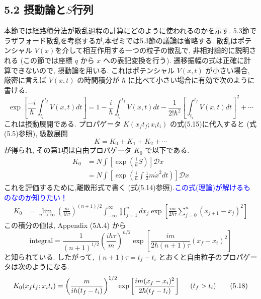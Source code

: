 \documentclass{jsarticle}
\begin{document}
\subsection*{\textrm{5.2 摂動論と$S$行列}}
本節では経路積分法が散乱過程の計算にどのように使われるのかを示す. 5.3節でラザフォード散乱を考察するが,本ゼミでは5.3節の議論は省略する. 散乱はポテンシャル $V(x)$を介して相互作用する一つの粒子の散乱で, 非相対論的に説明される (この節では座標 $q$ から $x$ への表記変換を行う). 遷移振幅の式は正確に計算できないので, 摂動論を用いる. これはポテンシャル $V(x, t)$ が小さい場合, 厳密に言えば $V(x, t)$ の時間積分が $\hbar$ に比べて小さい場合に有効で次のように書ける.
\begin{equation*}
    \exp\left[ \frac{-i}{\hbar} \int_{t_i}^{t_f} V(x, t)dt \right] = 1 - \frac{i}{\hbar} \int_{t_i}^{t_f} V(x, t)dt - \frac{1}{2!\hbar^2}\left[ \int_{t_i}^{t_f} V(x, t)dt \right]^2 + \cdots \tag{5.16}
\end{equation*} 
これは摂動展開である. プロパゲータ $K(x_{f}t_{f}; x_{i}t_{i})$ の式(5.15)に代入すると (式(5.5)参照), 級数展開
\begin{equation*}
    K = K_0 + K_1 + K_2 + \cdots \tag{5.17}
\end{equation*}
が得られ, その第1項は自由プロパゲータ $K_0$ で以下である.
\begin{align*}
    K_0 &= N \int \left[ \exp \left( \frac{i}{\hbar}S \right) \right]\mathcal{D}x\\
    &= N \int \left[ \exp \left( \frac{i}{\hbar}\int \frac{1}{2}m\dot{x}^2 dt \right) \right]\mathcal{D}x
\end{align*}
これを評価するために,離散形式で書く (式(5.14)参照).\textcolor{blue}{この式(理論)が解けるものなのか知りたい！}
\begin{align*}
    K_0 &= \lim_{n \rightarrow \infty} \left( \frac{m}{ih\tau} \right)^{(n+1)/2} \int_{-\infty}^{\infty} \prod_{j=1}^{n}dx_{j} \exp\left[ \frac{im}{2\hbar\tau}\sum_{j=0}^{n} (x_{j+1} - x_{j})^2 \right]
\end{align*}
この積分の値は, Appendix (5A.4) から
\begin{equation*}
    \textrm{integral} = \frac{1}{(n+1)^{1/2}}\left( \frac{ih\tau}{m} \right)^{n/2} \exp\left[ \frac{im}{2\hbar (n+1)\tau} (x_{f} - x_{i})^2 \right]
\end{equation*}
と知られている. したがって, $(n + 1)\tau = t_{f} - t_{i}$ とおくと自由粒子のプロパゲータは次のようになる.
\begin{equation*}
    K_{0}(x_{f}t_{f}; x_{i}t_{i}) = \left( \frac{m}{ih(t_{f} - t_{i})} \right)^{1/2}\exp\left[ \frac{im(x_{f} - x_{i})^2 }{2\hbar(t_{f} - t_{i})} \right]\hspace{0.5cm} (t_{f} > t_i) \tag{5.18}
\end{equation*}
\end{document}
